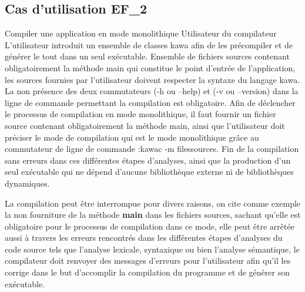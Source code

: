 \subsection{Cas d'utilisation EF\_2}
\fiche
{Compiler une application en mode monolithique}                    %
{Utilisateur du compilateur}                               %
{                                                %
  L'utilisateur introduit un ensemble de classes
  kawa afin de les précompiler et de générer le tout dans un seul exécutable.
}
{
	Ensemble de fichiers sources contenant obligatoirement la méthode main qui constitue le point d'entrée de l'application, les sources fournies par l'utilisateur doivent respecter la syntaxe du langage kawa.
	La non présence des deux commutateurs (-h ou --help) et (-v ou --version) dans la ligne de commande permettant la compilation est obligatoire.
}                                                %
{
Afin de déclencher le processus de compilation en mode monolithique, il faut fournir un fichier source contenant obligatoirement la méthode main, ainsi que l'utilisateur doit préciser le mode de compilation qui est le mode monolithique grâce au commutateur de ligne de commande :kawac -m filessources.}    %
{
	Fin de la compilation sans erreurs dans ces différentes étapes d'analyses, ainsi que la production d’un seul exécutable qui ne dépend d'aucune bibliothèque externe ni de bibliothèques dynamiques.  
}  %
{                                                %
  
}
{} %
{La compilation peut être interrompue pour divers raisons, on cite comme exemple la non fourniture de la méthode \textbf {main} dans les fichiers sources, sachant qu'elle est obligatoire pour le processus de compilation dans ce mode, elle peut être arrêtée aussi à travers les erreurs rencontrés dans les différentes étapes d'analyses du code source  tels que l'analyse lexicale, syntaxique ou bien l'analyse sémantique, le compilateur doit renvoyer des messages d'erreurs pour l'utilisateur afin qu'il les corrige dans le but d'accomplir la compilation du programme et de générer son exécutable.  } %


